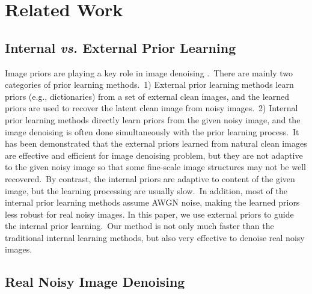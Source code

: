 \documentclass[10pt,twocolumn,letterpaper]{article}
\begin{document}
\section{Related Work}

\vspace{-1mm}
\subsection{Internal \textbf{\emph{vs.}} External Prior Learning}

Image priors are playing a key role in image denoising \cite{pgpd,epll,ksvd,ple,ncsr,iraniinternal}.\ There are mainly two categories of prior learning methods.\ 1) External prior learning methods \cite{foe,pgpd,epll} learn priors (e.g., dictionaries) from a set of external clean images, and the learned priors are used to recover the latent clean image from noisy images.\ 2) Internal prior learning methods \cite{ksvd,ncsr,ple,iraniinternal} directly learn priors from the given noisy image, and the image denoising is often done simultaneously with the prior learning process.\ It has been demonstrated \cite{pgpd,epll} that the external priors learned from natural clean images are effective and efficient for image denoising problem, but they are not adaptive to the given noisy image so that some fine-scale image structures may not be well recovered.\ By contrast, the internal priors are adaptive to content of the given image, but the learning processing are usually slow.\ In addition, most of the internal prior learning methods \cite{ksvd,ncsr,ple,iraniinternal} assume AWGN noise, making the learned priors less robust for real noisy images. In this paper, we use external priors to guide the internal prior learning.\ Our method is not only much faster than the traditional internal learning methods, but also very effective to denoise real noisy images.

\vspace{-1mm}
\subsection{Real Noisy Image Denoising}
\end{document}
